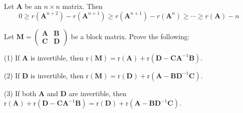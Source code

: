 \documentclass[12pt, a4paper, oneside]{book}
\begin{document}
\begin{corollary}
    Let $\mathbf{A}$ be an $n \times n$ matrix. Then
    \[
        0 \geq r(\mathbf{A}^{n+2})- r(\mathbf{A}^{n+1})
        \geq r(\mathbf{A}^{n+1}) -r(\mathbf{A}^n)
        \geq \cdots \geq r(\mathbf{A})-n
    \]
\end{corollary}


\begin{theorem}
    Let $\mathbf{M}=\left(\begin{matrix}\mathbf{A} & \mathbf{B} \\ \mathbf{C} & \mathbf{D}\end{matrix}\right)$ be a block matrix. Prove the following:

    (1) If $\mathbf{A}$ is invertible, then $\mathrm{r}(\mathbf{M})=\mathrm{r}(\mathbf{A})+\mathrm{r}\left(\mathbf{D}-{\mathbf{C} \mathbf{A}}^{-1} \mathbf{B}\right)$.

    (2) If $\mathbf{D}$ is invertible, then $\mathrm{r}(\mathbf{M})=\mathrm{r}(\mathbf{D})+\mathrm{r}\left(\mathbf{A}-\mathbf{B} \mathbf{D}^{-1} \mathbf{C}\right)$.

    (3) If both $\mathbf{A}$ and $\mathbf{D}$ are invertible, then $\mathrm{r}(\mathbf{A})+\mathrm{r}\left(\mathbf{D}-\mathbf{C} \mathbf{A}^{-1} \mathbf{B}\right)=\mathrm{r}(\mathbf{D})+\mathrm{r}\left(\mathbf{A}-\mathbf{B} \mathbf{D}^{-1} \mathbf{C}\right)$.
\end{theorem}
\end{document}
